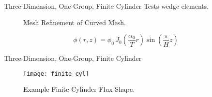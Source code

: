 \begin{frame}{Three-Dimension, One-Group, Finite Cylinder}
  Tests wedge elements.
  \begin{table}
    \label{tab:finite_cyl}
    \begin{center}
    \end{center}
  \end{table}
  \begin{figure}
    \centering
    \vspace{0.2in}
    \caption{Mesh Refinement of Curved Mesh.}
    \label{fig:circle_meshes}
  \end{figure}
  \begin{equation}
    \label{eq:analytic_finite_cyl}
    \phi(r,z) = \phi_0 \, 
      J_0\left(\frac{\alpha_0}{T} r\right) \sin\left(\frac{\pi}{H} z \right)
  \end{equation}
\end{frame}

\begin{frame}{Three-Dimension, One-Group, Finite Cylinder}
  \begin{figure}
    \centering
    \texttt{[image: finite\_cyl]}
    \caption{Example Finite Cylinder Flux Shape.}
    \label{fig:finite_cyl}
  \end{figure}
\end{frame}

